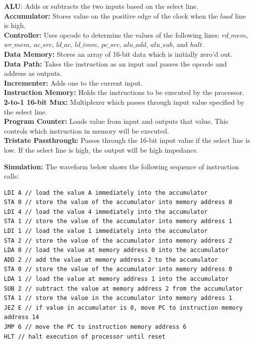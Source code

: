 \documentclass{article}         %
\begin{document}
\textbf{ALU}: Adds or subtracts the two inputs based on the select line.\\
\textbf{Accumulator:} Stores value on the positive edge of the clock when the $load$ line is high.\\
\textbf{Controller:} Uses opcode to determine the values of the following lines: $rd\_mem$, $wr\_mem$, $ac\_src$, $ld\_ac$, $ld\_imm$, $pc\_src$, $alu\_add$, $alu\_sub$, and $halt$.\\
\textbf{Data Memory:} Stores an array of 16-bit data which is initially zero'd out.\\
\textbf{Data Path:} Takes the instruction as an input and passes the opcode and address as outputs.\\
\textbf{Incrementer:} Adds one to the current input.\\
\textbf{Instruction Memory:} Holds the instructions to be executed by the processor.\\
\textbf{2-to-1 16-bit Mux:} Multiplexer which passes through input value specified by the select line.\\
\textbf{Program Counter:} Loads value from input and outputs that value. This controls which instruction in memory will be executed.\\
\textbf{Tristate Passthrough:} Passes through the 16-bit input value if the select line is low. If the select line is high, the output will be high impedance.\\

\newpage

\textbf{Simulation:} The waveform below shows the following sequence of instruction calls:
\begin{verbatim}
LDI A // load the value A immediately into the accumulator
STA 0 // store the value of the accumulator into memory address 0
LDI 4 // load the value 4 immediately into the accumulator
STA 1 // store the value of the accumulator into memory address 1
LDI 1 // load the value 1 immediately into the accumulator
STA 2 // store the value of the accumulator into memory address 2
LDA 0 // load the value at memory address 0 into the accumulator
ADD 2 // add the value at memory address 2 to the accumulator
STA 0 // store the value of the accumulator into memory address 0
LDA 1 // load the value at memory address 1 into the accumulator
SUB 2 // subtract the value at memory address 2 from the accumulator
STA 1 // store the value in the accumulator into memory address 1
JEZ E // if value in accumulator is 0, move PC to instruction memory address 14
JMP 6 // move the PC to instruction memory address 6
HLT // halt execution of processor until reset
\end{verbatim}
\end{document}
